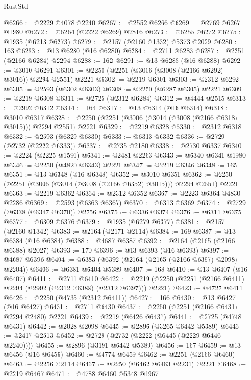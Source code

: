 \begin{lexlean}{RustStd}
\begin{coremodule}
@6266 := @2229 @4078 @2240
@6267 := @2552 @6266
@6269 := @2769 @6267 @1980
@6272 := @6264 (@2222 @6269) @2816
@6273 := @6255 @6272
@6275 := @1935 (@6213 @6273)
@6279 := @2157 (@2160 @1332) @5373 @2029
@6280 := 163
@6283 := @13 @6280 (@16 @6280)
@6284 := @2711 @6283
@6287 := @2251 (@2166 @6284) @2294
@6288 := 162
@6291 := @13 @6288 (@16 @6288)
@6292 := @3010 @6291
@6301 := @2250 (@2251 (@3006 (@3008 (@2166 @6292) @3016)) @2294 @2551) @2221
@6302 := @2219 @6301
@6303 := @2312 @6292
@6305 := @2593 (@6302 @6303)
@6308 := @2250 (@6287 @6305) @2221
@6309 := @2219 @6308
@6311 := @2725 (@2312 @6284)
@6312 := @4444 @2515
@6313 := @2992 @6312
@6314 := 164
@6317 := @13 @6314 (@16 @6314)
@6318 := @3010 @6317
@6328 := @2250 (@2251 (@3006 (@3014 (@3008 (@2166 @6318) @3015))) @2294 @2551) @2221
@6329 := @2219 @6328
@6330 := @2312 @6318
@6332 := @2593 (@6329 @6330)
@6333 := @6313 @6332
@6336 := @2729 (@2732 (@2222 @6333))
@6337 := @2735 @2180
@6338 := @2730 @6337
@6340 := @2224 (@2225 @1591)
@6341 := @2481 @2263
@6343 := @6340 @6341 @1980
@6346 := @2250 (@4820 @6343) @2221
@6347 := @2219 @6346
@6348 := 165
@6351 := @13 @6348 (@16 @6348)
@6352 := @3010 @6351
@6362 := @2250 (@2251 (@3006 (@3014 (@3008 (@2166 @6352) @3015))) @2294 @2551) @2221
@6363 := @2219 @6362
@6364 := @2312 @6352
@6367 := @2223 @6364 @4830 @2286
@6369 := @2593 (@6363 @6367)
@6370 := @6313 @6369
@6374 := @2729 (@6338 (@6347 @6370)) @2756
@6375 := @6336 @6374
@6376 := @6311 @6375
@6377 := @6309 @6376
@6379 := @1935 (@6279 @6377)
@6381 := @2157 (@2160 @1342)
@6383 := @2164 (@2171 @2114)
@6384 := 169
@6387 := @13 @6384 (@16 @6384)
@6388 := @4687 @6387
@6392 := @2164 (@2165 (@2166 @6388) @2027)
@6393 := 170
@6396 := @13 @6393 (@16 @6393)
@6397 := @4687 @6396
@6404 := @6383 (@6392 (@2164 (@2165 (@2166 @6397) @2098) @2204))
@6406 := @6381 @6404 @5389
@6407 := 168
@6410 := @13 @6407 (@16 @6407)
@6411 := @2711 @6410
@6422 := @2219 (@2250 (@2251 (@2166 @6411) @2294 (@2992 (@2312 @6388) (@2312 @6397))) @2221)
@6423 := @4727 @6411
@6426 := @2250 (@4735 (@2312 @6411))
@6427 := 166
@6430 := @13 @6427 (@16 @6427)
@6431 := @2711 @6430
@6437 := @2250 (@2251 (@2166 @6431) @2294 @2480) @2221
@6439 := @2219 (@6426 @6437)
@6441 := @2725 (@4748 @6431)
@6442 := @2028 @2098
@6445 := @2896 (@3265 @6442 @5389)
@6446 := @2417 @2513
@6452 := @2729 (@2732 (@2222 (@6445 (@2229 @6446 @2240))))
@6455 := @2896 (@3191 @6442 @5389)
@6456 := 167
@6459 := @13 @6456 (@16 @6456)
@6460 := @4774 @6459
@6462 := @2251 (@2166 @6460)
@6463 := @2256 @2114
@6467 := @2250 (@6462 @6463 @2231) @2221
@6468 := @2219 @6467
@6471 := @4788 @6460 @5348 @1967

\end{coremodule}
\end{lexlean}
